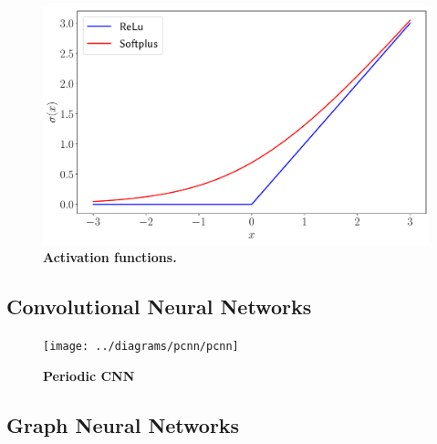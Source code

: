 \begin{figure}[h]
	\centering
	\includegraphics[width=0.7\linewidth]{Chapter4/Figs/Vector/activations}
	\caption[Activation functions]{\textbf{Activation functions.}}
	\label{fig:activations}
\end{figure}

\subsection{Convolutional Neural Networks}
\label{subsec:nn-cnn}

\begin{figure}
	\centering
	\texttt{[image: ../diagrams/pcnn/pcnn]}
	\caption[Periodic CNN]{\textbf{Periodic CNN}}
	\label{fig:pcnn}
\end{figure}


\subsection{Graph Neural Networks}
\label{subsec:nn-gnn}